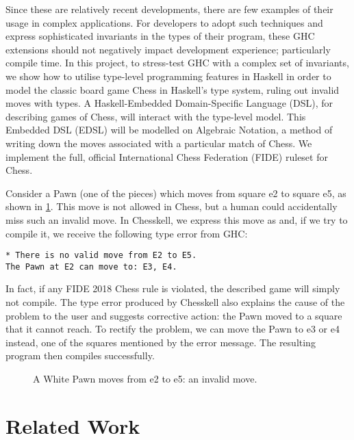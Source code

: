 Since these are relatively recent developments, there are few examples of their usage in complex applications. For developers to adopt such techniques and express sophisticated invariants in the types of their program, these GHC extensions should not negatively impact development experience; particularly compile time. In this project, to stress-test GHC with a complex set of invariants, we show how to utilise type-level programming features in Haskell in order to model the classic board game Chess in Haskell's type system, ruling out invalid moves with types. A Haskell-Embedded Domain-Specific Language (DSL), for describing games of Chess, will interact with the type-level model. This Embedded DSL (EDSL) will be modelled on Algebraic Notation, a method of writing down the moves associated with a particular match of Chess. We implement the full, official International Chess Federation (FIDE) ruleset for Chess.

Consider a Pawn (one of the pieces) which moves from square e2 to square e5, as shown in \cref{badpawnmove}. This move is not allowed in Chess, but a human could accidentally miss such an invalid move. In Chesskell, we express this move as  and, if we try to compile it, we receive the following type error from GHC:

\begin{verbatim}
* There is no valid move from E2 to E5.
The Pawn at E2 can move to: E3, E4.
\end{verbatim}

In fact, if any FIDE 2018 Chess rule is violated, the described game will simply not compile. The type error produced by Chesskell also explains the cause of the problem to the user and suggests corrective action: the Pawn moved to a square that it cannot reach. To rectify the problem, we can move the Pawn to e3 or e4 instead, one of the squares mentioned by the error message. The resulting program then compiles successfully.

\begin{figure}[h]
    \centering
    \vspace*{1cm}
    \showboard
    \quad
    \showboard
    \caption{A White Pawn moves from e2 to e5: an invalid move.}
    \label{badpawnmove}
\end{figure}

\section{Related Work}

